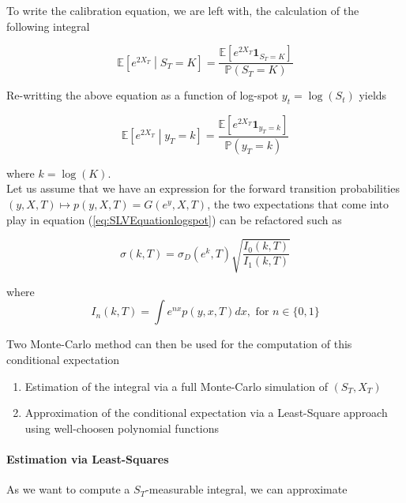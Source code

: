 \documentclass{article}
\begin{document}
\noindent To write the calibration equation, we are left with, the calculation of the following integral

\begin{equation}
	\mathbb{E}\left[e^{2X_T}\middle| S_T=K\right] = \frac{\mathbb{E}\left[e^{2X_T} \textbf{1}_{S_T=K}\right]}{\mathbb{P}(S_T = K)}
\end{equation}

\noindent Re-writting the above equation as a function of log-spot $y_t = \log\left(S_t\right)$ yields

\begin{equation}
	\label{eq:SLVEquationlogspot}
	\mathbb{E}\left[e^{2X_T}\middle| y_T=k\right] = \frac{\mathbb{E}\left[e^{2X_T} \textbf{1}_{y_T=k}\right]}{\mathbb{P}(y_T = k)}
\end{equation}

\noindent where $k = \log(K)$.\\

\noindent Let us assume that we have an expression for the forward transition probabilities $(y,X,T) \mapsto p(y,X,T) = G(e^y,X,T)$, the two expectations that come into play in equation (\ref{eq:SLVEquationlogspot}) can be refactored such as

\begin{equation}
	\label{eq:calibrationlocalvolSLV}
	\sigma(k,T) = \sigma_D(e^k, T) \sqrt{\frac{I_0(k,T)}{I_1(k,T)}}
\end{equation}

\noindent where
\begin{equation}
	\label{eq:Inintegral}
	I_n(k,T) = \int e^{nx} p(y,x,T) dx, \text{ for } n \in \{0,1\}
\end{equation}

\noindent Two Monte-Carlo method can then be used for the computation of this conditional expectation

\begin{enumerate}
	\item Estimation of the integral via a full Monte-Carlo simulation of $(S_T,X_T)$
	\item Approximation of the conditional expectation via a Least-Square approach using well-choosen polynomial functions
\end{enumerate}

\paragraph{Estimation via Least-Squares}
As we want to compute a $S_T$-measurable integral, we can approximate
\end{document}
